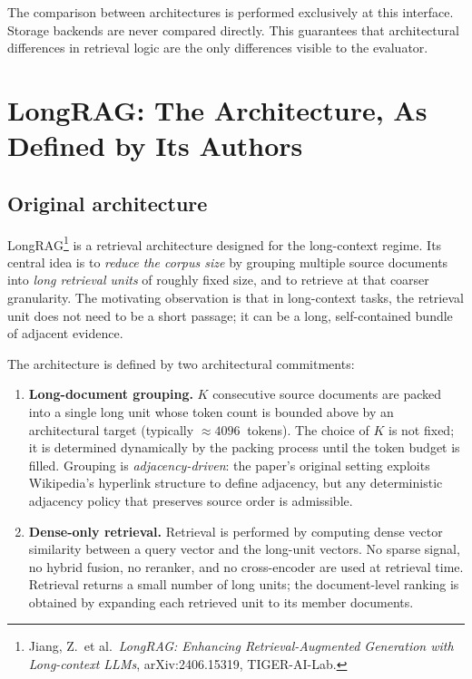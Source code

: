 \documentclass[11pt,a4paper]{article}
\begin{document}
The comparison between architectures is performed exclusively at
this interface. Storage backends are never compared directly.
This guarantees that architectural differences in retrieval logic
are the only differences visible to the evaluator.

\section{LongRAG: The Architecture, As Defined by Its Authors}\label{sec:longrag}

\subsection{Original architecture}
LongRAG\footnote{Jiang, Z.\ et al.\ \emph{LongRAG: Enhancing
Retrieval-Augmented Generation with Long-context LLMs},
arXiv:2406.15319, TIGER-AI-Lab.} is a retrieval architecture
designed for the long-context regime. Its central idea is to
\emph{reduce the corpus size} by grouping multiple source documents
into \emph{long retrieval units} of roughly fixed size, and to
retrieve at that coarser granularity. The motivating observation is
that in long-context tasks, the retrieval unit does not need to be
a short passage; it can be a long, self-contained bundle of
adjacent evidence.

The architecture is defined by two architectural commitments:

\begin{enumerate}[leftmargin=1.5em,itemsep=0.15em]
  \item \textbf{Long-document grouping.} $K$ consecutive source
    documents are packed into a single long unit whose token count
    is bounded above by an architectural target (typically
    $\approx \SI{4096}{}$ tokens). The choice of $K$ is not fixed;
    it is determined dynamically by the packing process until the
    token budget is filled. Grouping is \emph{adjacency-driven}:
    the paper's original setting exploits Wikipedia's hyperlink
    structure to define adjacency, but any deterministic
    adjacency policy that preserves source order is admissible.
  \item \textbf{Dense-only retrieval.} Retrieval is performed by
    computing dense vector similarity between a query vector and
    the long-unit vectors. No sparse signal, no hybrid fusion, no
    reranker, and no cross-encoder are used at retrieval time.
    Retrieval returns a small number of long units; the
    document-level ranking is obtained by expanding each retrieved
    unit to its member documents.
\end{enumerate}
\end{document}
